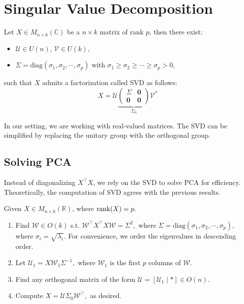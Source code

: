 \documentclass[12pt]{article}
\begin{document}
\section{Singular Value Decomposition}

\begin{thmbox}
    Let $X\in M_{n\times k}(\mathbb{C})$ be a $n\times k$ matrix of rank $p$, then there exist:
    \begin{itemize}
        \item $\mathcal{U}\in U(n),\,\mathcal{V}\in U(k),$
        \item $\Sigma=\text{diag}(\sigma_1,\sigma_2,\cdots,\sigma_p)$ with $\sigma_1\ge\sigma_2\ge\cdots\ge\sigma_p>0,$ 
    \end{itemize}
    such that $X$ admits a factorization called SVD as follows:
    \[X=\mathcal{U}\underbrace{\begin{pmatrix}
    \Sigma & \mathbf{0}\\
    \mathbf{0} & \mathbf{0}
    \end{pmatrix}}_{\Sigma_0}\mathcal{V}^*\]
\end{thmbox}

\begin{remark}
    In our setting, we are working with real-valued matrices. The SVD can be simplified by replacing the unitary group with the orthogonal group.
\end{remark}

\subsection{Solving PCA}

Instead of diagonalizing $X^\top X$, we rely on the SVD to solve PCA for efficiency.
Theoretically, the computation of SVD agrees with the previous results.
\begin{mybox}
Given $X\in M_{n\times k}(\mathbb{R})$, where $\operatorname{rank}(X)=p.$
\begin{enumerate}
    \item Find $\mathcal{W}\in O(k)$ s.t. $\mathcal{W}^\top X^\top X\mathcal{W} = \Sigma^2,$
    where $\Sigma=\text{diag}(\sigma_1,\sigma_2,\cdots,\sigma_p),$ where $\sigma_i=\sqrt{\lambda_i}$. For convenience, we order the eigenvalues in descending order.
    \item Let $\mathcal{U}_1=X\mathcal{W}_1\Sigma^{-1},$ where $\mathcal{W}_1$ is the first $p$ columns of $\mathcal{W}.$
    \item Find any orthogonal matrix of the form $\mathcal{U}=[\mathcal{U}_1\mid *]\in O(n).$
    \item Compute $X=\mathcal{U}\Sigma_0\mathcal{W}^\top,$ as desired.
\end{enumerate}
\end{mybox}
\end{document}

